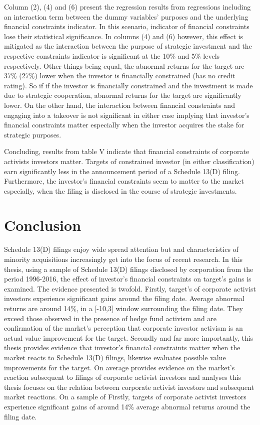 \documentclass[12pt]{article}
\begin{document}
Column (2), (4) and (6) present the regression results from regressions including an interaction term between the dummy variables' purposes and the underlying financial constraints indicator. In this scenario, indicator of financial constraints lose their statistical significance. In columns (4) and (6) however, this effect is mitigated as the interaction between the purpose of strategic investment and the respective constraints indicator is significant at the 10\% and 5\% levels respectively. Other things being equal, the abnormal returns for the target are 37\% (27\%) lower when the investor is financially constrained (has no credit rating). So if if the investor is financially constrained and the investment is made due to strategic cooperation, abnormal returns for the target are significantly lower. On the other hand, the interaction between financial constraints and engaging into a takeover is not significant in either case implying that investor's financial constraints matter especially when the investor acquires the stake for strategic purposes. 

Concluding, results from table V indicate that financial constraints of corporate activists investors matter. Targets of constrained investor (in either classification) earn significantly less in the announcement period of a Schedule 13(D) filing. Furthermore, the investor's financial constraints seem to matter to the market especially, when the filing is disclosed in the course of strategic investments. 


\section{Conclusion}

Schedule 13(D) filings enjoy wide spread attention but and characteristics of minority acquisitions increasingly get into the focus of recent research.
In this thesis, using a sample of Schedule 13(D) filings disclosed by corporation from the period 1996-2016, the effect of investor's financial constraints on target's gains is examined. The evidence presented is twofold. Firstly,  target's of corporate activist investors experience significant gains around the filing date. Average abnormal returns are around 14\%, in a [-10,3] window surrounding the filing date. They exceed those observed in the presence of hedge fund activism and are confirmation of the market's perception that corporate investor activism is an actual value improvement for the target. 
Secondly and far more importantly, this thesis provides evidence that investor's financial constraints matter when the market reacts to Schedule 13(D) filings, likewise evaluates possible value improvements for the target. On average
provides evidence on the market's reaction subsequent to filings of corporate activist investors and analyses 
this thesis focuses on the relation between corporate activist investors and subsequent market reactions.
On a sample of 
Firstly, targets of corporate activist investors experience significant gains of around 14\% average abnormal returns around the filing date.  
\end{document}
